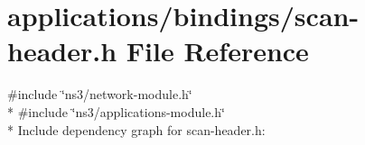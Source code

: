 \hypertarget{applications_2bindings_2scan-header_8h}{}\section{applications/bindings/scan-\/header.h File Reference}
\label{applications_2bindings_2scan-header_8h}
{\ttfamily \#include \char`\"{}ns3/network-\/module.\+h\char`\"{}}\\*
{\ttfamily \#include \char`\"{}ns3/applications-\/module.\+h\char`\"{}}\\*
Include dependency graph for scan-\/header.h\+:
